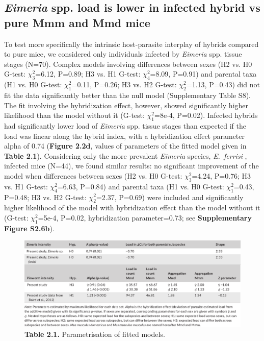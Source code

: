 \subsection{\textit{Eimeria} spp. load is lower in infected hybrid vs pure Mmm and Mmd mice} 
To test more specifically the intrinsic host-parasite interplay of hybrids compared to pure mice, we considered only individuals infected by \textit{Eimeria} spp. tissue stages (N=70). Complex models involving differences between sexes (H2 vs. H0 G-test: $\chi_{3}^{2}$=6.12, P=0.89; H3 vs. H1 G-test: $\chi_{4}^{2}$=8.09, P=0.91) and parental taxa (H1 vs. H0 G-test: $\chi_{1}^{2}$=0.11, P=0.26; H3 vs. H2 G-test: $\chi_{2}^{2}$=1.13, P=0.43) did not fit the data significantly better than the null model (Supplementary Table S8). The fit involving the hybridization effect, however, showed significantly higher likelihood than the model without it (G-test: $\chi_{1}^{2}$=8e-4, P=0.02). Infected hybrids had significantly lower load of \textit{Eimeria} spp. tissue stages than expected if the load was linear along the hybrid index, with a hybridization effect parameter alpha of 0.74 (\textbf{Figure 2.2d}, values of parameters of the fitted model given in \textbf{Table 2.1}). Considering only the more prevalent \textit{Eimeria} species, \textit{E.~ferrisi} , infected mice (N=44), we found similar results: no significant improvement of the model when differences between sexes (H2 vs. H0 G-test: $\chi_{3}^{2}$=4.24, P=0.76; H3 vs. H1 G-test: $\chi_{4}^{2}$=6.63, P=0.84) and parental taxa (H1 vs. H0 G-test: $\chi_{1}^{2}$=0.43, P=0.48; H3 vs. H2 G-test: $\chi_{2}^{2}$=2.37, P=0.69) were included and significantly higher likelihood of the model with hybridization effect than the model without it (G-test: $\chi_{1}^{2}$=5e-4, P=0.02, hybridization parameter=0.73; see \textbf{Supplementary Figure S2.6b}). 

\begin{figure}[H]
	\centering
	\includegraphics[width=\linewidth,height=\textheight,keepaspectratio]{images/2article1/Table1.pdf}
	\captionsetup{labelformat=empty}
	\caption{\textbf{Table 2.1.} Parametrisation of fitted models.}
\end{figure}
\addtocounter{figure}{-1}

